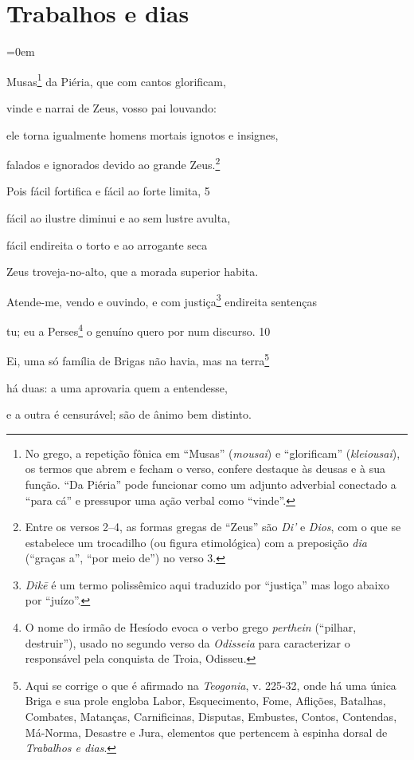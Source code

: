 \chapter{Trabalhos e dias}

\parindent=0em

Musas\footnote{No grego, a repetição fônica em ``Musas'' (\emph{m\emph{ousai}}) e
``glorificam'' (\emph{klei\emph{ousai}}), os termos que abrem e fecham o
verso, confere destaque às deusas e à sua função. ``Da Piéria'' pode
funcionar como um adjunto adverbial conectado a ``para cá'' e pressupor
uma ação verbal como ``vinde''.} da Piéria, que com cantos glorificam,

vinde e narrai de Zeus, vosso pai louvando:

ele torna igualmente homens mortais ignotos e insignes,

falados e ignorados devido ao grande Zeus.\footnote{Entre os versos 2--4, as formas gregas de ``Zeus'' são \emph{Di'} e
\emph{Dios}, com o que se estabelece um trocadilho (ou figura
etimológica) com a preposição \emph{dia} (``graças a'', ``por meio de'')
no verso 3.}

Pois fácil fortifica e fácil ao forte limita, \num{5}

fácil ao ilustre diminui e ao sem lustre avulta,

fácil endireita o torto e ao arrogante seca

Zeus troveja-no-alto, que a morada superior habita.

Atende-me, vendo e ouvindo, e com justiça\footnote{\emph{Dikē} é um termo polissêmico aqui traduzido por ``justiça'' mas
logo abaixo por ``juízo''.} endireita sentenças

tu; eu a Perses\footnote{O nome do irmão de Hesíodo evoca o verbo grego \emph{perthein}
(``pilhar, destruir''), usado no segundo verso da \emph{Odisseia} para
caracterizar o responsável pela conquista de Troia, Odisseu.} o genuíno quero por num discurso. \num{10}

Ei, uma só família de Brigas não havia, mas na terra\footnote{Aqui se corrige o que é afirmado na \emph{Teogonia}, v. 225-32, onde
há uma única Briga e sua prole engloba Labor, Esquecimento, Fome,
Aflições, Batalhas, Combates, Matanças, Carnificinas, Disputas,
Embustes, Contos, Contendas, Má-Norma, Desastre e Jura, elementos que
pertencem à espinha dorsal de \emph{Trabalhos e dias}.}

há duas: a uma aprovaria quem a entendesse,

e a outra é censurável; são de ânimo bem distinto.

